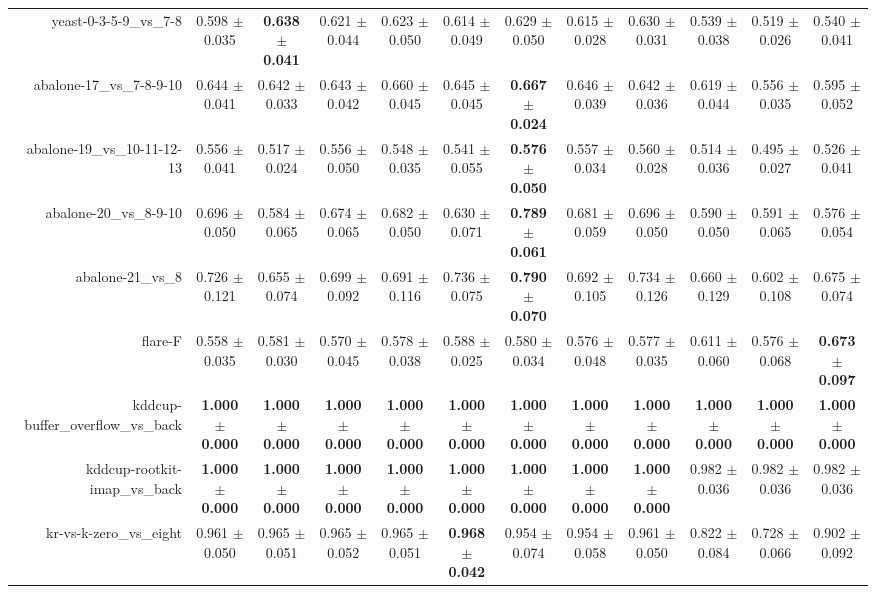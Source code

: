 \begin{table}[!ht]
{\begin{tabular}{r c c c c c c c c c c c}
yeast-0-3-5-9\_vs\_7-8 & 0.598 $\pm$ 0.035 & \textbf{0.638 $\pm$ 0.041} & 0.621 $\pm$ 0.044 & 0.623 $\pm$ 0.050 & 0.614 $\pm$ 0.049 & 0.629 $\pm$ 0.050 & 0.615 $\pm$ 0.028 & 0.630 $\pm$ 0.031 & 0.539 $\pm$ 0.038 & 0.519 $\pm$ 0.026 & 0.540 $\pm$ 0.041 \\
abalone-17\_vs\_7-8-9-10 & 0.644 $\pm$ 0.041 & 0.642 $\pm$ 0.033 & 0.643 $\pm$ 0.042 & 0.660 $\pm$ 0.045 & 0.645 $\pm$ 0.045 & \textbf{0.667 $\pm$ 0.024} & 0.646 $\pm$ 0.039 & 0.642 $\pm$ 0.036 & 0.619 $\pm$ 0.044 & 0.556 $\pm$ 0.035 & 0.595 $\pm$ 0.052 \\
abalone-19\_vs\_10-11-12-13 & 0.556 $\pm$ 0.041 & 0.517 $\pm$ 0.024 & 0.556 $\pm$ 0.050 & 0.548 $\pm$ 0.035 & 0.541 $\pm$ 0.055 & \textbf{0.576 $\pm$ 0.050} & 0.557 $\pm$ 0.034 & 0.560 $\pm$ 0.028 & 0.514 $\pm$ 0.036 & 0.495 $\pm$ 0.027 & 0.526 $\pm$ 0.041 \\
abalone-20\_vs\_8-9-10 & 0.696 $\pm$ 0.050 & 0.584 $\pm$ 0.065 & 0.674 $\pm$ 0.065 & 0.682 $\pm$ 0.050 & 0.630 $\pm$ 0.071 & \textbf{0.789 $\pm$ 0.061} & 0.681 $\pm$ 0.059 & 0.696 $\pm$ 0.050 & 0.590 $\pm$ 0.050 & 0.591 $\pm$ 0.065 & 0.576 $\pm$ 0.054 \\
abalone-21\_vs\_8 & 0.726 $\pm$ 0.121 & 0.655 $\pm$ 0.074 & 0.699 $\pm$ 0.092 & 0.691 $\pm$ 0.116 & 0.736 $\pm$ 0.075 & \textbf{0.790 $\pm$ 0.070} & 0.692 $\pm$ 0.105 & 0.734 $\pm$ 0.126 & 0.660 $\pm$ 0.129 & 0.602 $\pm$ 0.108 & 0.675 $\pm$ 0.074 \\
flare-F & 0.558 $\pm$ 0.035 & 0.581 $\pm$ 0.030 & 0.570 $\pm$ 0.045 & 0.578 $\pm$ 0.038 & 0.588 $\pm$ 0.025 & 0.580 $\pm$ 0.034 & 0.576 $\pm$ 0.048 & 0.577 $\pm$ 0.035 & 0.611 $\pm$ 0.060 & 0.576 $\pm$ 0.068 & \textbf{0.673 $\pm$ 0.097} \\
kddcup-buffer\_overflow\_vs\_back & \textbf{1.000 $\pm$ 0.000} & \textbf{1.000 $\pm$ 0.000} & \textbf{1.000 $\pm$ 0.000} & \textbf{1.000 $\pm$ 0.000} & \textbf{1.000 $\pm$ 0.000} & \textbf{1.000 $\pm$ 0.000} & \textbf{1.000 $\pm$ 0.000} & \textbf{1.000 $\pm$ 0.000} & \textbf{1.000 $\pm$ 0.000} & \textbf{1.000 $\pm$ 0.000} & \textbf{1.000 $\pm$ 0.000} \\
kddcup-rootkit-imap\_vs\_back & \textbf{1.000 $\pm$ 0.000} & \textbf{1.000 $\pm$ 0.000} & \textbf{1.000 $\pm$ 0.000} & \textbf{1.000 $\pm$ 0.000} & \textbf{1.000 $\pm$ 0.000} & \textbf{1.000 $\pm$ 0.000} & \textbf{1.000 $\pm$ 0.000} & \textbf{1.000 $\pm$ 0.000} & 0.982 $\pm$ 0.036 & 0.982 $\pm$ 0.036 & 0.982 $\pm$ 0.036 \\
kr-vs-k-zero\_vs\_eight & 0.961 $\pm$ 0.050 & 0.965 $\pm$ 0.051 & 0.965 $\pm$ 0.052 & 0.965 $\pm$ 0.051 & \textbf{0.968 $\pm$ 0.042} & 0.954 $\pm$ 0.074 & 0.954 $\pm$ 0.058 & 0.961 $\pm$ 0.050 & 0.822 $\pm$ 0.084 & 0.728 $\pm$ 0.066 & 0.902 $\pm$ 0.092 \\

\end{tabular}}
\end{table}
